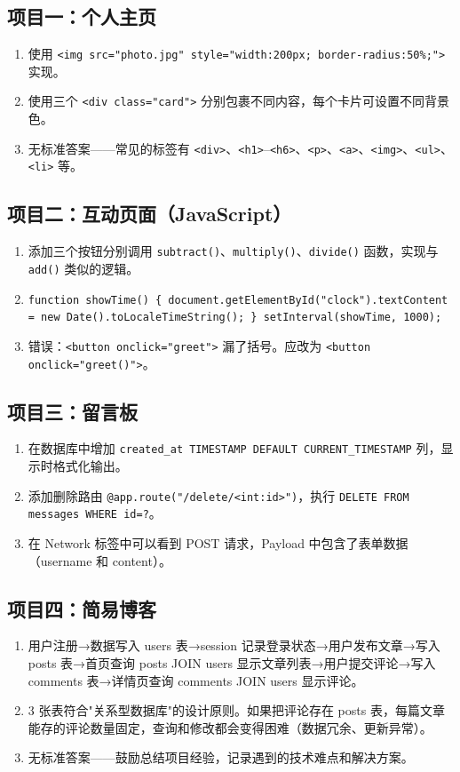 \documentclass[a4paper,12pt]{ctexart}
\begin{document}
\subsection*{项目一：个人主页}
\begin{enumerate}
  \item 使用 \texttt{<img src="photo.jpg" style="width:200px; border-radius:50\%;">} 实现。
  \item 使用三个 \texttt{<div class="card">} 分别包裹不同内容，每个卡片可设置不同背景色。
  \item 无标准答案——常见的标签有 \texttt{<div>}、\texttt{<h1>}--\texttt{<h6>}、\texttt{<p>}、\texttt{<a>}、\texttt{<img>}、\texttt{<ul>}、\texttt{<li>} 等。
\end{enumerate}

\subsection*{项目二：互动页面（JavaScript）}
\begin{enumerate}
  \item 添加三个按钮分别调用 \texttt{subtract()}、\texttt{multiply()}、\texttt{divide()} 函数，实现与 \texttt{add()} 类似的逻辑。
  \item \texttt{function showTime() \{ document.getElementById("clock").textContent = new Date().toLocaleTimeString(); \} setInterval(showTime, 1000);}
  \item 错误：\texttt{<button onclick="greet">} 漏了括号。应改为 \texttt{<button onclick="greet()">}。
\end{enumerate}

\subsection*{项目三：留言板}
\begin{enumerate}
  \item 在数据库中增加 \texttt{created\_at TIMESTAMP DEFAULT CURRENT\_TIMESTAMP} 列，显示时格式化输出。
  \item 添加删除路由 \texttt{@app.route("/delete/<int:id>")}，执行 \texttt{DELETE FROM messages WHERE id=?}。
  \item 在 Network 标签中可以看到 POST 请求，Payload 中包含了表单数据（username 和 content）。
\end{enumerate}

\subsection*{项目四：简易博客}
\begin{enumerate}
  \item 用户注册→数据写入 users 表→session 记录登录状态→用户发布文章→写入 posts 表→首页查询 posts JOIN users 显示文章列表→用户提交评论→写入 comments 表→详情页查询 comments JOIN users 显示评论。
  \item 3 张表符合"关系型数据库"的设计原则。如果把评论存在 posts 表，每篇文章能存的评论数量固定，查询和修改都会变得困难（数据冗余、更新异常）。
  \item 无标准答案——鼓励总结项目经验，记录遇到的技术难点和解决方案。
\end{enumerate}
\end{document}
